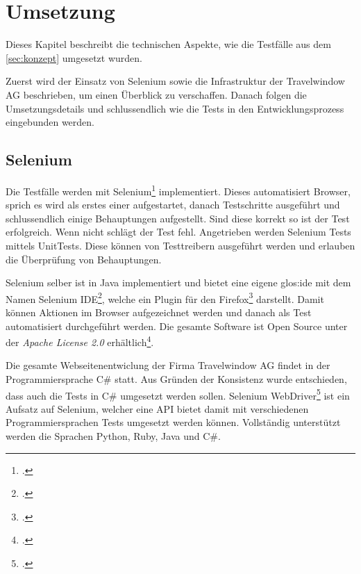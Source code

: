 

\chapter{Umsetzung}
\label{sec:umsetzung}

Dieses Kapitel beschreibt die technischen Aspekte, wie die Testfälle aus dem \cref{sec:konzept}  umgesetzt wurden.

Zuerst wird der Einsatz von Selenium sowie die Infrastruktur der Travelwindow AG beschrieben, um einen Überblick zu verschaffen. Danach folgen die Umsetzungsdetails und schlussendlich wie die Tests in den Entwicklungsprozess eingebunden werden.

\section{Selenium}
\label{sec:umsetzung:selenium}
Die Testfälle werden mit Selenium\footcite{Selenium_-_Web_Browser_Automation_2015-09-26} implementiert. Dieses automatisiert Browser, sprich es wird als erstes einer aufgestartet, danach Testschritte ausgeführt und schlussendlich einige Behauptungen aufgestellt. Sind diese korrekt so ist der Test erfolgreich. Wenn nicht schlägt der Test fehl. 
Angetrieben werden Selenium Tests mittels UnitTests. Diese können von Testtreibern ausgeführt werden und erlauben die Überprüfung von Behauptungen.

Selenium selber ist in Java implementiert und bietet eine eigene \Gls{glos:ide} mit dem Namen Selenium IDE\footcite{Selenium_IDE_Plugins_2015-09-26}, welche ein Plugin für den Firefox\footcite{Download_Firefox__Free_Web_Browser__Mozilla_2015-09-26} darstellt. Damit können Aktionen im Browser aufgezeichnet werden und danach als Test automatisiert durchgeführt werden. Die gesamte Software ist Open Source unter der \textit{Apache License 2.0} erhältlich\footcite{Selenium_software_-_Wikipedia,_the_free_encyclopedia_2015-09-26}.

Die gesamte Webseitenentwiclung der Firma Travelwindow AG findet in der Programmiersprache C\# statt. Aus Gründen der Konsistenz wurde entschieden, dass auch die Tests in C\# umgesetzt werden sollen. 
Selenium WebDriver\footcite{Selenium_WebDriver_2015-09-26} ist ein Aufsatz auf Selenium, welcher eine API bietet damit mit verschiedenen Programmiersprachen Tests umgesetzt werden können. Vollständig unterstützt werden die Sprachen Python, Ruby, Java und C\#. 

